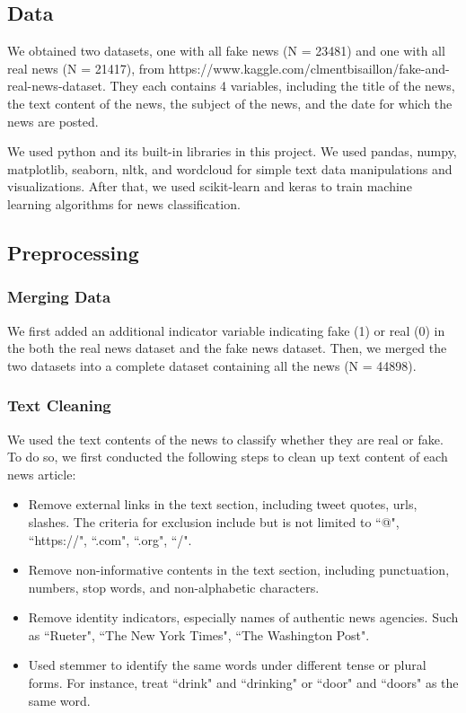 \documentclass{article}
\begin{document}
\begin{multicols}{2}
\subsection{Data}
We obtained two datasets, one with all fake news (N = 23481) and one with all real news (N = 21417), from https://www.kaggle.com/clmentbisaillon/fake-and-real-news-dataset. They each contains 4 variables, including the title of the news, the text content of the news, the subject of the news, and the date for which the news are posted. 

We used python and its built-in libraries in this project. We used pandas, numpy, matplotlib, seaborn, nltk, and wordcloud for simple text data manipulations and visualizations. After that, we used scikit-learn and keras to train machine learning algorithms for news classification.

\subsection{Preprocessing}

\subsubsection{Merging Data}
We first added an additional indicator variable indicating fake (1) or real (0) in the both the real news dataset and the fake news dataset. Then, we merged the two datasets into a complete dataset containing all the news (N = 44898). 

\subsubsection{Text Cleaning}
We used the text contents of the news to classify whether they are real or fake. To do so, we first conducted the following steps to clean up text content of each news article:


\begin{itemize}[noitemsep]
  \item Remove external links in the text section, including tweet quotes, urls, slashes. The criteria for exclusion include but is not limited to ``@", ``https://", ``.com", ``.org", ``/".
  \item Remove non-informative contents in the text section, including punctuation, numbers, stop words, and non-alphabetic characters.
  \item Remove identity indicators, especially names of authentic news agencies. Such as ``Rueter", ``The New York Times", ``The Washington Post".
  \item Used stemmer to identify the same words under different tense or plural forms. For instance, treat ``drink" and ``drinking" or ``door" and ``doors" as the same word.
\end{itemize}


\end{multicols}
\end{document}
